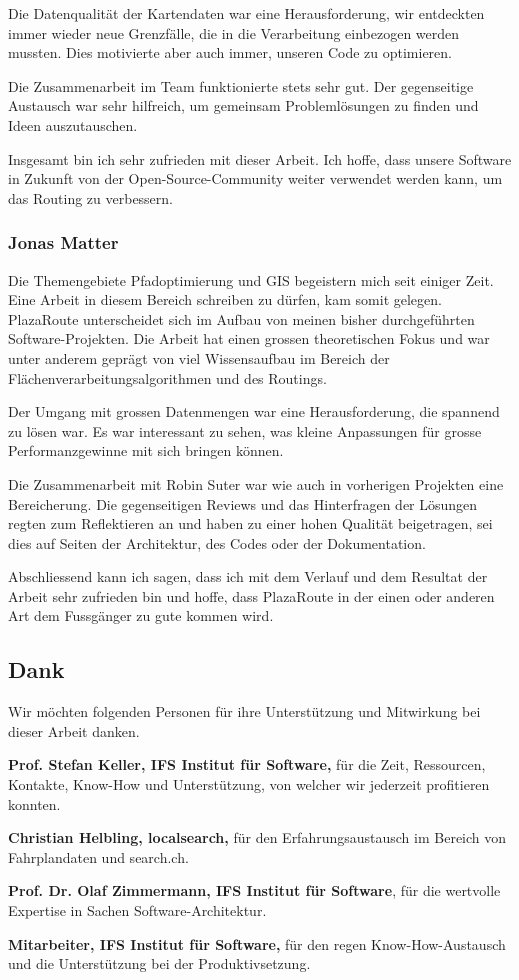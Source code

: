 Die Datenqualität der Kartendaten war eine Herausforderung, wir entdeckten immer wieder neue Grenzfälle, die in die Verarbeitung einbezogen werden mussten. Dies motivierte aber auch immer, unseren Code zu optimieren.

Die Zusammenarbeit im Team funktionierte stets sehr gut. Der gegenseitige Austausch war sehr hilfreich, um gemeinsam Problemlösungen zu finden und Ideen auszutauschen.

Insgesamt bin ich sehr zufrieden mit dieser Arbeit. Ich hoffe, dass unsere Software in Zukunft von der Open-Source-Community weiter verwendet werden kann, um das Routing zu verbessern.


\subsubsection{Jonas Matter}
\label{Persönliche Berichte:Jonas Matter}
Die Themengebiete Pfadoptimierung und \ac{GIS} begeistern mich seit einiger Zeit. Eine Arbeit in diesem Bereich schreiben zu dürfen, kam somit gelegen. PlazaRoute unterscheidet sich im Aufbau von meinen bisher durchgeführten Software-Projekten. Die Arbeit hat einen grossen theoretischen Fokus und war unter anderem geprägt von viel Wissensaufbau im Bereich der Flächenverarbeitungsalgorithmen und des Routings. 

Der Umgang mit grossen Datenmengen war eine Herausforderung, die spannend zu lösen war. Es war interessant zu sehen, was kleine Anpassungen für grosse Performanzgewinne mit sich bringen können.

Die Zusammenarbeit mit Robin Suter war wie auch in vorherigen Projekten eine Bereicherung. Die gegenseitigen Reviews und das Hinterfragen der Lösungen regten zum Reflektieren an und haben zu einer hohen Qualität beigetragen, sei dies auf Seiten der Architektur, des Codes oder der Dokumentation.

Abschliessend kann ich sagen, dass ich mit dem Verlauf und dem Resultat der Arbeit sehr zufrieden bin und hoffe, dass PlazaRoute in der einen oder anderen Art dem Fussgänger zu gute kommen wird.


\subsection{Dank}
\label{sub:Dank}

Wir möchten folgenden Personen für ihre Unterstützung und Mitwirkung bei dieser Arbeit danken.

\textbf{Prof. Stefan Keller, IFS Institut für Software,} für die Zeit, Ressourcen, Kontakte, Know-How und Unterstützung, von welcher wir jederzeit profitieren konnten.

\textbf{Christian Helbling, localsearch,} für den Erfahrungsaustausch im Bereich von Fahrplandaten und search.ch.

\textbf{Prof. Dr. Olaf Zimmermann, IFS Institut für Software}, für die wertvolle Expertise in Sachen Software-Architektur.

\textbf{Mitarbeiter, IFS Institut für Software,} für den regen Know-How-Austausch und die Unterstützung bei der Produktivsetzung.
